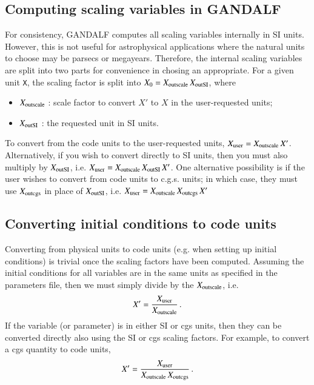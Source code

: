 \documentclass[a4paper]{article}
\newcommand{\var}[1]{\texttt{#1}}
\begin{document}
\subsection{Computing scaling variables in GANDALF}
For consistency, GANDALF computes all scaling variables internally in SI units.  However, this is not useful for astrophysical applications where the natural units to choose may be parsecs or megayears.  Therefore, the internal scaling variables are split into two parts for convenience in chosing an appropriate.  For a given unit \var{X}, the scaling factor is split into $X_0 = X_{\rm outscale} \, X_{\rm outSI}$, where
\begin{itemize}
\item $X_{\rm outscale}$ : scale factor to convert $X'$ to $X$ in the user-requested units;
\item $X_{\rm outSI}$ : the requested unit in SI units.
\end{itemize}
To convert from the code units to the user-requested units, $X_{\rm user} = X_{\rm outscale}\,X'$.  Alternatively, if you wish to convert directly to SI units, then you must also multiply by $X_{\rm outSI}$, i.e. $X_{\rm user} = X_{\rm outscale}\,X_{\rm outSI}\,X'$.  One alternative possibility is if the user wishes to convert from code units to c.g.s. units; in which case, they must use $X_{\rm outcgs}$ in place of $X_{\rm outSI}$, i.e. $X_{\rm user} = X_{\rm outscale}\,X_{\rm outcgs}\,X'$

\subsection{Converting initial conditions to code units}
Converting from physical units to code units (e.g. when setting up initial conditions) is trivial once the scaling factors have been computed.  Assuming the initial conditions for all variables are in the same units as specified in the parameters file, then we must simply divide by the $X_{\rm outscale}$, i.e.
\begin{equation}
X' = \frac{X_{\rm user}}{X_{\rm outscale}}\,.
\end{equation}
If the variable (or parameter) is in either SI or cgs units, then they can be converted directly also using the SI or cgs scaling factors.  For example, to convert a cgs quantity to code units, 
\begin{equation}
X' = \frac{X_{\rm user}}{X_{\rm outscale}\,X_{\rm outcgs}}\,.
\end{equation}
\end{document}
